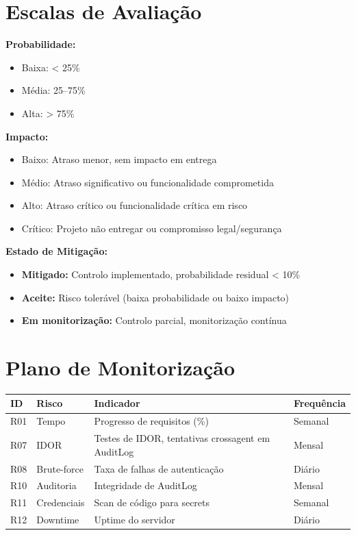 \documentclass[a4paper,11pt]{article}
\begin{document}
\section{Escalas de Avaliação}

\textbf{Probabilidade:}
\begin{itemize}[nosep]
    \item Baixa: < 25\%
    \item Média: 25--75\%
    \item Alta: > 75\%
\end{itemize}

\textbf{Impacto:}
\begin{itemize}[nosep]
    \item Baixo: Atraso menor, sem impacto em entrega
    \item Médio: Atraso significativo ou funcionalidade comprometida
    \item Alto: Atraso crítico ou funcionalidade crítica em risco
    \item Crítico: Projeto não entregar ou compromisso legal/segurança
\end{itemize}

\textbf{Estado de Mitigação:}
\begin{itemize}[nosep]
    \item \textbf{Mitigado:} Controlo implementado, probabilidade residual < 10\%
    \item \textbf{Aceite:} Risco tolerável (baixa probabilidade ou baixo impacto)
    \item \textbf{Em monitorização:} Controlo parcial, monitorização contínua
\end{itemize}

\section{Plano de Monitorização}

\begin{longtable}{L{0.7cm} L{2.5cm} L{4cm} L{2.5cm}}
    \toprule
    \textbf{ID} & \textbf{Risco} & \textbf{Indicador} & \textbf{Frequência} \\
    \midrule
    \endhead
    R01 & Tempo & Progresso de requisitos (\%) & Semanal \\
    R07 & IDOR & Testes de IDOR, tentativas crossagent em AuditLog & Mensal \\
    R08 & Brute-force & Taxa de falhas de autenticação & Diário \\
    R10 & Auditoria & Integridade de AuditLog & Mensal \\
    R11 & Credenciais & Scan de código para secrets & Semanal \\
    R12 & Downtime & Uptime do servidor & Diário \\
    \bottomrule
\end{longtable}
\end{document}
